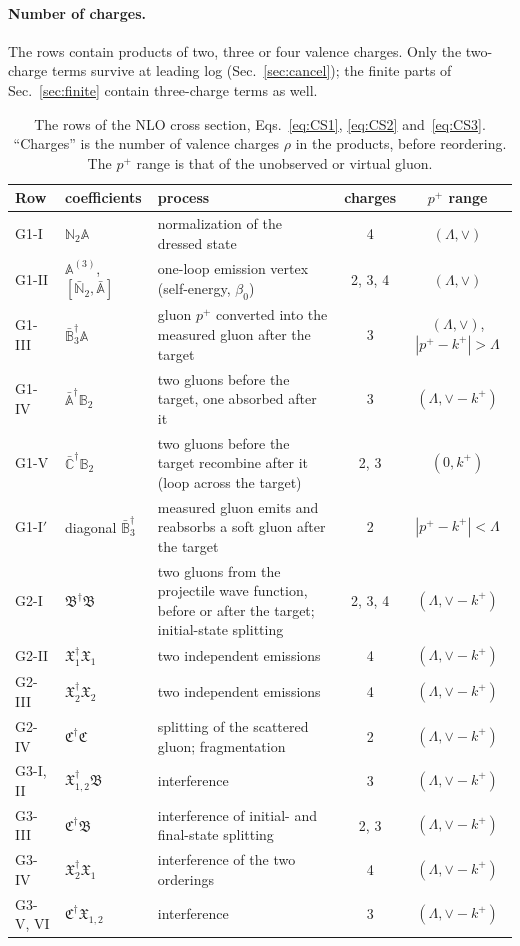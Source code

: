 \documentclass[aps,prd,onecolumn,superscriptaddress,nofootinbib,floatfix,longbibliography,11pt]{revtex4-2}
\numberwithin{equation}{section}
\def\mf#1{\mathbb{#1}}
\begin{document}
\paragraph*{Number of charges.} The rows contain products of two, three or four valence charges. Only the two-charge terms survive at leading log (Sec.~\ref{sec:cancel}); the finite parts of Sec.~\ref{sec:finite} contain three-charge terms as well.

\begin{table}[!tbp]
\centering
\renewcommand{\arraystretch}{1.25}
\begin{tabular}{llL{5.7cm}cc}
\toprule
Row & coefficients & process & charges & $p^+$ range\\
\midrule
G1-I & $\mf N_2\mf A$ & normalization of the dressed state & 4 & $(\Lambda,\vee)$\\
G1-II & $\mf A^{(3)}$, $[\bar{\mf N}_2,\bar{\mf A}]$ & one-loop emission vertex (self-energy, $\beta_0$) & 2, 3, 4 & $(\Lambda,\vee)$\\
G1-III & $\bar{\mf B}_3^\dagger\mf A$ & gluon $p^+$ converted into the measured gluon after the target & 3 & $(\Lambda,\vee)$, $|p^+-k^+|>\Lambda$\\
G1-IV & $\bar{\mf A}^\dagger\mf B_2$ & two gluons before the target, one absorbed after it & 3 & $(\Lambda,\vee-k^+)$\\
G1-V & $\bar{\mf C}^\dagger\mf B_2$ & two gluons before the target recombine after it (loop across the target) & 2, 3 & $(0,k^+)$\\
G1-I$'$ & diagonal $\bar{\mf B}_3^\dagger$ & measured gluon emits and reabsorbs a soft gluon after the target & 2 & $|p^+-k^+|<\Lambda$\\
\midrule
G2-I & $\mathfrak B^\dagger\mathfrak B$ & two gluons from the projectile wave function, before or after the target; initial-state splitting & 2, 3, 4 & $(\Lambda,\vee-k^+)$\\
G2-II & $\mathfrak X_1^\dagger\mathfrak X_1$ & two independent emissions & 4 & $(\Lambda,\vee-k^+)$\\
G2-III & $\mathfrak X_2^\dagger\mathfrak X_2$ & two independent emissions & 4 & $(\Lambda,\vee-k^+)$\\
G2-IV & $\mathfrak C^\dagger\mathfrak C$ & splitting of the scattered gluon; fragmentation & 2 & $(\Lambda,\vee-k^+)$\\
\midrule
G3-I, II & $\mathfrak X_{1,2}^\dagger\mathfrak B$ & interference & 3 & $(\Lambda,\vee-k^+)$\\
G3-III & $\mathfrak C^\dagger\mathfrak B$ & interference of initial- and final-state splitting & 2, 3 & $(\Lambda,\vee-k^+)$\\
G3-IV & $\mathfrak X_2^\dagger\mathfrak X_1$ & interference of the two orderings & 4 & $(\Lambda,\vee-k^+)$\\
G3-V, VI & $\mathfrak C^\dagger\mathfrak X_{1,2}$ & interference & 3 & $(\Lambda,\vee-k^+)$\\
\bottomrule
\end{tabular}
\caption{The rows of the NLO cross section, Eqs.~\eqref{eq:CS1}, \eqref{eq:CS2} and~\eqref{eq:CS3}. ``Charges'' is the number of valence charges $\rho$ in the products, before reordering. The $p^+$ range is that of the unobserved or virtual gluon.}
\label{tab:rows}
\end{table}
\end{document}
